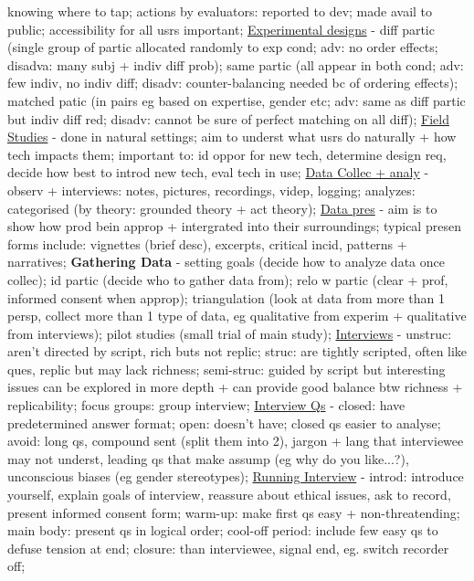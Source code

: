\documentclass[a4paper]{article}
\begin{document}
\begin{multicols}{3}
        knowing where to tap; actions by evaluators: reported to dev; made avail to public; accessibility for all usrs important; \underline{Experimental designs} - diff partic (single group of partic allocated
        randomly to exp cond; adv: no order effects; disadva: many subj + indiv diff prob); same partic (all appear in both cond; adv: few indiv, no indiv diff; disadv: counter-balancing needed bc of ordering effects);
        matched patic (in pairs eg based on expertise, gender etc; adv: same as diff partic but indiv diff red; disadv: cannot be sure of perfect matching on all diff); \underline{Field Studies} - done in natural
        settings; aim to underst what usrs do naturally + how tech impacts them; important to: id oppor for new tech, determine design req, decide how best to introd new tech, eval tech in use;
        \underline{Data Collec + analy} - observ + interviews: notes, pictures, recordings, videp, logging; analyzes: categorised (by theory: grounded theory + act theory); \underline{Data pres} -
        aim is to show how prod bein approp + intergrated into their surroundings; typical presen forms include: vignettes (brief desc), excerpts, critical incid, patterns + narratives; \newline
        \textbf{Gathering Data} - setting goals (decide how to analyze data once collec); id partic (decide who to gather data from); relo w partic (clear + prof, informed consent when approp);
        triangulation (look at data from more than 1 persp, collect more than 1 type of data, eg qualitative from experim + qualitative from interviews); pilot studies (small trial of main study);
        \underline{Interviews} -
        unstruc: aren't directed by script, rich buts not replic; struc: are tightly scripted, often like ques, replic but may lack richness; semi-struc: guided by script but interesting issues
        can be explored in more depth + can provide good balance btw richness + replicability; focus groups: group interview; \underline{Interview Qs} - closed: have predetermined answer format; open: doesn't have;
        closed qs easier to analyse; avoid: long qs, compound sent (split them into 2), jargon + lang that interviewee may not underst, leading qs that make assump (eg why do you like...?), unconscious biases
        (eg gender stereotypes); \underline{Running Interview} - introd: introduce yourself, explain goals of interview, reassure about ethical issues, ask to record, present informed consent form; warm-up:
        make first qs easy + non-threatending; main body: present qs in logical order; cool-off period: include few easy qs to defuse tension at end; closure: than interviewee, signal end, eg. switch recorder off;

\end{multicols}
\end{document}

